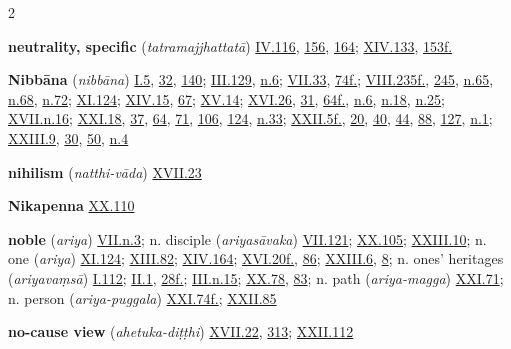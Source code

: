 \begin{multicols}{2}
\begin{vismHanging}
\par\textbf{neutrality, specific} (\emph{tatramajjhattatā}) \hyperlink{IV.116}{IV.116}{}, \hyperlink{IV.156}{156}{}, \hyperlink{IV.164}{164}{}; \hyperlink{XIV.133}{XIV.133}{}, \hyperlink{XIV.153}{153f.}{}
\par\textbf{Nibbāna} (\emph{nibbāna}) \hyperlink{I.5}{I.5}{}, \hyperlink{I.32}{32}{}, \hyperlink{I.140}{140}{}; \hyperlink{III.129}{III.129}{}, \hyperlink{III.n6}{n.6}{}; \hyperlink{VII.33}{VII.33}{}, \hyperlink{VII.74}{74f.}{}; \hyperlink{VIII.235}{VIII.235f.}{}, \hyperlink{VIII.245}{245}{}, \hyperlink{VIII.n65}{n.65}{}, \hyperlink{VIII.n68}{n.68}{}, \hyperlink{VIII.n72}{n.72}{}; \hyperlink{XI.124}{XI.124}{}; \hyperlink{XIV.15}{XIV.15}{}, \hyperlink{XIV.67}{67}{}; \hyperlink{XV.14}{XV.14}{}; \hyperlink{XVI.26}{XVI.26}{}, \hyperlink{XVI.31}{31}{}, \hyperlink{XVI.64}{64f.}{}, \hyperlink{XVI.n6}{n.6}{}, \hyperlink{XVI.n18}{n.18}{}, \hyperlink{XVI.n25}{n.25}{}; \hyperlink{XVII.n16}{XVII.n.16}{}; \hyperlink{XXI.18}{XXI.18}{}, \hyperlink{XXI.37}{37}{}, \hyperlink{XXI.64}{64}{}, \hyperlink{XXI.71}{71}{}, \hyperlink{XXI.106}{106}{}, \hyperlink{XXI.124}{124}{}, \hyperlink{XXI.n33}{n.33}{}; \hyperlink{XXII.5}{XXII.5f.}{}, \hyperlink{XXII.20}{20}{}, \hyperlink{XXII.40}{40}{}, \hyperlink{XXII.44}{44}{}, \hyperlink{XXII.88}{88}{}, \hyperlink{XXII.127}{127}{}, \hyperlink{XXII.n1}{n.1}{}; \hyperlink{XXIII.9}{XXIII.9}{}, \hyperlink{XXIII.30}{30}{}, \hyperlink{XXIII.50}{50}{}, \hyperlink{XXIII.n4}{n.4}{}
\par\textbf{nihilism} (\emph{natthi-vāda}) \hyperlink{XVII.23}{XVII.23}{}
\par\textbf{Nikapenna} \hyperlink{XX.110}{XX.110}{}
\par\textbf{noble} (\emph{ariya}) \hyperlink{VII.n3}{VII.n.3}{}; n. disciple (\emph{ariyasāvaka}) \hyperlink{VII.121}{VII.121}{}; \hyperlink{XX.105}{XX.105}{}; \hyperlink{XXIII.10}{XXIII.10}{}; n. one (\emph{ariya}) \hyperlink{XI.124}{XI.124}{}; \hyperlink{XIII.82}{XIII.82}{}; \hyperlink{XIV.164}{XIV.164}{}; \hyperlink{XVI.20}{XVI.20f.}{}, \hyperlink{XVI.86}{86}{}; \hyperlink{XXIII.6}{XXIII.6}{}, \hyperlink{XXIII.8}{8}{}; n. ones’ heritages (\emph{ariyavaṃsā}) \hyperlink{I.112}{I.112}{}; \hyperlink{II.1}{II.1}{}, \hyperlink{II.28}{28f.}{}; \hyperlink{III.n15}{III.n.15}{}; \hyperlink{XX.78}{XX.78}{}, \hyperlink{XX.83}{83}{}; n. path (\emph{ariya-magga}) \hyperlink{XXI.71}{XXI.71}{}; n. person (\emph{ariya-puggala}) \hyperlink{XXI.74}{XXI.74f.}{}; \hyperlink{XXII.85}{XXII.85}{}
\par\textbf{no-cause view} (\emph{ahetuka-diṭṭhi}) \hyperlink{XVII.22}{XVII.22}{}, \hyperlink{XVII.313}{313}{}; \hyperlink{XXII.112}{XXII.112}{}

\end{vismHanging}
\end{multicols}
